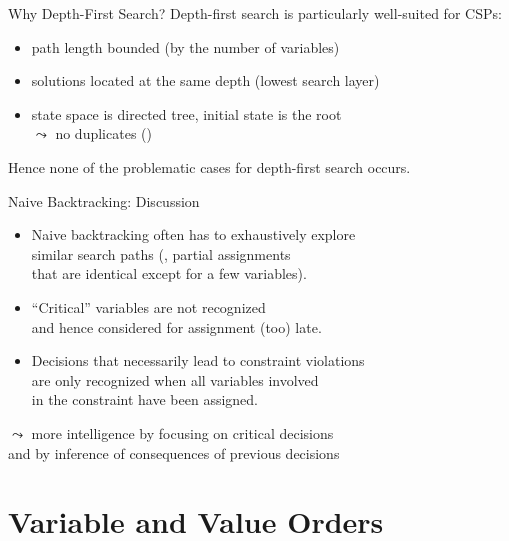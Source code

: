 \begin{frame}{Why Depth-First Search?}
  Depth-first search is particularly well-suited for CSPs:
  \begin{itemize}
  \item path length \alert{bounded} (by the number of variables)
  \item solutions located at \alert{the same depth} (lowest search
  layer)
  \item state space is directed \alert{tree}, initial state is the
  root \\ $\leadsto$ \alert{no duplicates} ()
  \end{itemize}
  Hence none of the problematic cases for depth-first search occurs.
\end{frame}

\begin{frame}{Naive Backtracking: Discussion}
  \begin{itemize}
  \item Naive backtracking often has to exhaustively explore \\
    \alert{similar} search paths (\ie, partial assignments \\ that are
    identical except for a few variables).
  \item ``Critical'' variables are not recognized \\ and hence
    considered for assignment (too) late.
  \item Decisions that necessarily lead to constraint violations
    \\ are only recognized when all variables involved \\ in the
    constraint have been assigned.
  \end{itemize}

  $\leadsto$ more intelligence by \alert{focusing on critical
    decisions} \\ \invisible{$\leadsto$} and by \alert{inference} of
  consequences of previous decisions
\end{frame}

\section{Variable and Value Orders}

